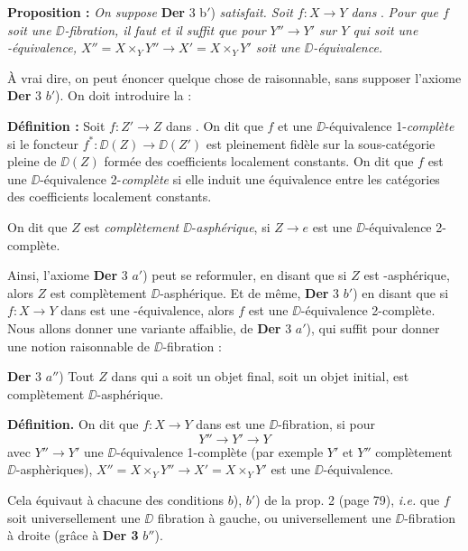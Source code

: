 \textbf{Proposition :} \textit{On suppose} \textbf{Der} 3 \textup{b}$'$) \textit{satisfait. Soit $f : X \to Y$ dans} \Dia. \textit{Pour que $f$ soit une $\DD$-fibration, il faut et il suffit que pour $Y'' \to Y'$ sur $Y$ qui soit une} \Hot\textit{-équivalence, $X'' = X \times_Y Y'' \to X' = X \times_Y Y'$ soit une $\DD$-équivalence.}

À vrai dire, on peut énoncer quelque chose de raisonnable, sans supposer l’axiome \textbf{Der} 3 $b'$). On doit introduire la :

\textbf{Définition :} Soit $f : Z' \to Z$ dans \Dia. On dit que $f$ et une $\DD$-équivalence 1-\textit{complète} si le foncteur $f^* : \DD(Z) \to \DD(Z')$ est pleinement fidèle sur la sous-catégorie pleine de $\DD(Z)$ formée des coefficients localement constants. On dit que $f$ est une $\DD$-équivalence 2-\textit{complète} si elle induit une équivalence entre les catégories des coefficients localement constants. %

On dit que $Z$ est \textit{complètement} $\DD$-\textit{asphérique}, si $Z \to e$ est une $\DD$-équivalence 2-complète.


Ainsi, l’axiome \textbf{Der} 3 $a'$) peut se reformuler, en disant que si $Z$ est \Hot-asphérique, alors $Z$ est complètement $\DD$-asphérique. Et de même, \textbf{Der} 3 $b'$) en disant que si $f : X \to Y$ dans \Dia{} est une \Hot-équivalence, alors $f$ est une $\DD$-équivalence 2-complète. Nous allons donner une variante affaiblie, de \textbf{Der} 3 $a'$), qui suffit pour donner une notion raisonnable de $\DD$-fibration :

\textbf{Der} 3 $a''$) Tout $Z$ dans \Dia{} qui a soit un objet final, soit un objet initial, est complètement $\DD$-asphérique.

\textbf{Définition.} On dit que $f : X \to Y$ dans \Dia{} est une $\DD$-fibration, si pour
\[
Y'' \longrightarrow Y' \longrightarrow Y
\]
avec $Y'' \to Y'$ une $\DD$-équivalence 1-complète (par exemple $Y'$ et $Y''$ complètement $\DD$-asphèriques), $X'' = X \times_Y Y'' \longrightarrow X' = X \times_Y Y'$ est une $\DD$-équivalence. %

Cela équivaut à chacune des conditions $b$), $b'$) de la prop. 2 (page 79), \textit{i.e.} que $f$ soit universellement une $\DD$ fibration à gauche, ou universellement une $\DD$-fibration à droite (grâce à \textbf{Der 3} $b''$). %

